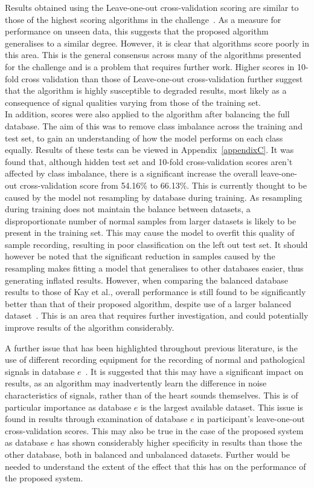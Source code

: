 \documentclass[titlepage, 12pt]{scrartcl} \usepackage{enumitem}
\begin{document}
Results obtained using the Leave-one-out cross-validation scoring are similar
to those of the highest scoring algorithms in the
challenge~\parencite{Homsi2017, Bobillo2016}. As a measure for performance on
unseen data, this suggests that the proposed algorithm generalises to a similar
degree. However, it is clear that algorithms score poorly in this area. This is
the general consensus across many of the algorithms presented for the
challenge and is a problem that requires further work. Higher scores in
10-fold cross validation than those of Leave-one-out cross-validation further
suggest that the algorithm is highly susceptible to degraded results, most
likely as a consequence of signal qualities varying from those of the training
set.\\
In addition, scores were also applied to the algorithm after balancing the full
database. The aim of this was to remove class imbalance across the training
and test set, to gain an understanding of how the model performs on each class
equally. Results of these tests can be viewed in Appendix~\ref{appendixC}. It
was found that, although hidden test set and 10-fold cross-validation scores
aren't affected by class imbalance, there is a significant increase the overall
leave-one-out cross-validation score from 54.16\% to 66.13\%. This is currently
thought to be caused by the model not resampling by database during training.
As resampling during training does not maintain the balance between datasets, a
disproportionate number of normal samples from larger datasets is likely to be
present in the training set. This may cause the model to overfit this quality
of sample recording, resulting in poor classification on the left out test set.
It should however be noted that the significant reduction in samples caused by
the resampling makes fitting a model that generalises to other databases easier,
thus generating inflated results. However, when comparing the balanced database
results to those of Kay et al., overall performance is still found to be
significantly better than that of their proposed algorithm, despite use of a
larger balanced dataset~\parencite{Kay2017}. This is an area that requires
further investigation, and could potentially improve results of the algorithm
considerably.

A further issue that has been highlighted throughout previous literature, is
the use of different recording equipment for the recording of normal and
pathological signals in database $e$~\parencite{Kay2017, Bobillo2016}. It is
suggested that this may have a significant impact on results, as an algorithm
may inadvertently learn the difference in noise characteristics of signals,
rather than of the heart sounds themselves. This is of particular importance as
database $e$ is the largest available dataset. This issue is found in results
through examination of database $e$ in participant's leave-one-out
cross-validation scores. This may also be true in the case of the proposed
system as database $e$ has shown considerably higher specificity in results
than those the other database, both in balanced and unbalanced datasets.
Further would be needed to understand the extent of the effect that this has on
the performance of the proposed system.
\end{document}
